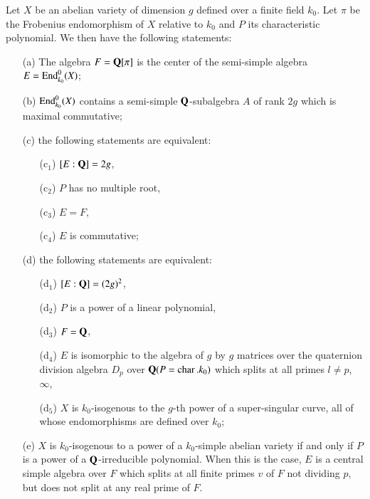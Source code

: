 \begin{thm}\label{apen1-thm3}
Let $X$ be an abelian variety of dimension $g$ defined over a finite field $k_0$. Let $\pi$ be the Frobenius endomorphism of $X$ relative to $k_0$ and $P$ its characteristic polynomial. We then have the following statements:
\begin{itemize}
\item[\rm (a)] The algebra $F = \mathbf{Q} [\pi]$ is the center of the semi-simple algebra $E =\operatorname{End}^0_{k_0} (X)$;

\item[\rm (b)] $\operatorname{End}^0_{k_0} (X)$ contains a semi-simple $\mathbf{Q}$-subalgebra $A$ of rank $2g$ which is maximal commutative;

\item[\rm (c)] the following statements are equivalent:
\begin{itemize}
\item[\rm (c$_1$)] $[E: \mathbf{Q}] = 2g$,

\item[\rm (c$_2$)] $P$ has no multiple root,

\item[\rm (c$_3$)] $E = F$,

\item[\rm (c$_4$)] $E$ is commutative;
\end{itemize}

\item[\rm (d)] the following statements are equivalent:
\begin{itemize}
\item[\rm (d$_1$)] $[E: \mathbf{Q}] = (2g)^2$, 

\item[\rm (d$_2$)] $P$ is a power of a linear polynomial,

\item[\rm (d$_3$)] $F = \mathbf{Q}$,

\item[\rm (d$_4$)] $E$ is isomorphic to the algebra of $g$ by $g$ matrices over the quaternion division algebra $D_p$ over $\mathbf{Q} (P = \operatorname{char}. k_0)$ which splits at all primes $l \neq p$, $\infty$,

\item[\rm (d$_5$)] $X$ is $k_0$-isogenous to the $g$-th power of a super-singular curve, all of whose endomorphisms are defined over $k_0$;
\end{itemize}

\item[\rm (e)] $X$ is $k_0$-isogenous to a power of a $k_0$-simple abelian variety if and only if $P$ is a power of a $\mathbf{Q}$-irreducible polynomial. When this is the case, $E$ is a central simple algebra over $F$ which splits at all finite primes $v$ of $F$ not dividing $p$, but does not split at any real prime of $F$.
\end{itemize}
\end{thm}

